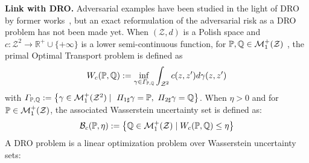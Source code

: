 \textbf{Link with DRO. } Adversarial examples have been studied in the light of DRO by former works~\citep{sinha2017certifying,tu2018theoretical}, but an exact reformulation of the adversarial risk as a DRO problem has not been made yet. %
When $(\mathcal{Z},d)$ is a Polish space and $c:\mathcal{Z}^2\rightarrow\mathbb{R}^+\cup\{+\infty\}$  is a lower semi-continuous function, for $\mathbb{P},\mathbb{Q}\in\mathcal{M}^+_1(\mathcal{Z})$ , the primal Optimal Transport problem is defined as
\begin{align*}
  W_c(\mathbb{P},\mathbb{Q}):=\inf_{\gamma\in\Gamma_{\mathbb{P},\mathbb{Q}}}  \int_{\mathcal{Z}^2} c(z,z')d\gamma(z,z')
\end{align*}
with $\Gamma_{\PP,\QQ}:=\left\{\gamma\in\mathcal{M}^+_1(\mathcal{Z}^2)\mid~\Pi_{1\sharp}\gamma = \PP,~\Pi_{2\sharp}\gamma = \QQ \right\}$. When $\eta>0$ and for $\mathbb{P}\in\mathcal{M}^+_1(\mathcal{Z})$, the associated Wasserstein uncertainty set is defined as: 
\begin{align*}
    \mathcal{B}_{c}(\PP,\eta) := \left\{\QQ\in \mathcal{M}^+_1(\mathcal{Z})\mid W_c(\PP,\QQ)\leq \eta\right\}
\end{align*}
A DRO problem is a linear optimization problem over Wasserstein uncertainty sets:

